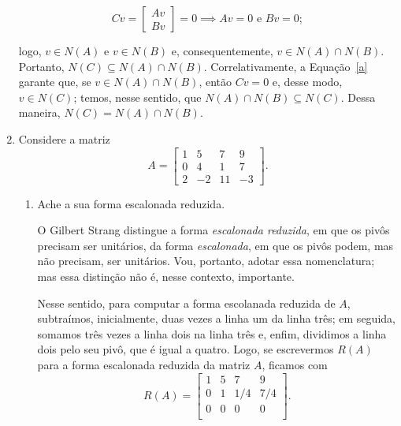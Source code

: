 \documentclass[leqno]{article}
\begin{document}
\begin{enumerate}
\begin{sol}
	    \begin{equation} \label{a}  
	    	Cv = 
		\begin{bmatrix} 
			Av \\ 
			Bv 
		\end{bmatrix} 
		= 0 \implies Av = 0 \text{ e } Bv = 0; 
	    \end{equation} 

	    \noindent logo, $v \in N(A)$ e $v \in N(B)$ e, consequentemente, $v \in N(A) \cap N(B)$. Portanto, $N(C) \subseteq N(A) \cap N(B)$. Correlativamente, a Equação~\eqref{a} garante que, se $v \in N(A) \cap N(B)$, então $Cv = 0$ e, desse modo, $v \in N(C)$; temos, nesse sentido, que $N(A) \cap N(B) \subseteq N(C)$. Dessa maneira, $N(C) = N(A) \cap N(B)$.  
    \end{sol} 

    \item Considere a matriz
        $$A = \begin{bmatrix} 
            1 & 5 & 7 & 9\\
            0 & 4 & 1 & 7 \\
            2 & -2 & 11 & -3
        \end{bmatrix}.$$

        \begin{enumerate}

            \item Ache a sua forma escalonada reduzida.
	    
	    \begin{sol} 
		    O Gilbert Strang \cite[página 89]{strang2006linear} distingue a forma \textit{escalonada reduzida}, em que os pivôs precisam ser unitários, da forma \textit{escalonada}, em que os pivôs podem, mas não precisam, ser unitários. Vou, portanto, adotar essa nomenclatura; mas essa distinção não é, nesse contexto, importante. 
		
		    Nesse sentido, para computar a forma escolanada reduzida de $A$, subtraímos, inicialmente, duas vezes a linha um da linha três; em seguida, somamos três vezes a linha dois na linha três e, enfim, dividimos a linha dois pelo seu pivô, que é igual a quatro. Logo, se escrevermos $R(A)$ para a forma escalonada reduzida da matriz $A$, ficamos com 
		\begin{equation*} 
			R(A) = 
			\begin{bmatrix}  
				1 & 5 & 7 & 9 \\ 
				0 & 1 & 1/4 & 7/4 \\ 
				0 & 0 & 0 & 0 \\ 
			\end{bmatrix}.  
		\end{equation*} 
	    \end{sol} 


\end{enumerate}
\end{enumerate}
\end{document}
